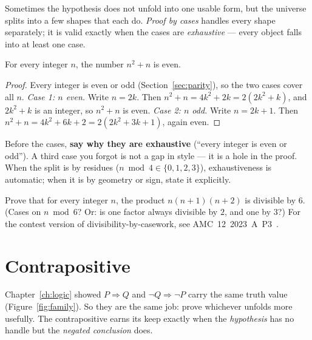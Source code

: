 Sometimes the hypothesis does not unfold into one usable form, but the universe
splits into a few shapes that each do. \emph{Proof by cases} handles every shape
separately; it is valid exactly when the cases are \emph{exhaustive} --- every
object falls into at least one case.

\begin{theorem}\label{thm:n2n}
For every integer $n$, the number $n^2 + n$ is even.
\end{theorem}

\begin{proof}
Every integer is even or odd (Section~\ref{sec:parity}), so the two cases cover
all $n$.
\emph{Case 1: $n$ even.} Write $n = 2k$. Then $n^2 + n = 4k^2 + 2k = 2(2k^2 + k)$,
and $2k^2 + k$ is an integer, so $n^2 + n$ is even.
\emph{Case 2: $n$ odd.} Write $n = 2k + 1$. Then
$n^2 + n = 4k^2 + 6k + 2 = 2(2k^2 + 3k + 1)$, again even.
\end{proof}

\begin{wins}
Before the cases, \textbf{say why they are exhaustive} (``every integer is even
or odd''). A third case you forgot is not a gap in style --- it is a hole in the
proof. When the split is by residues ($n \bmod 4 \in \{0,1,2,3\}$), exhaustiveness
is automatic; when it is by geometry or sign, state it explicitly.
\end{wins}

\begin{exercise}[medium]\label{exr:three}
Prove that for every integer $n$, the product $n(n+1)(n+2)$ is divisible by $6$.
(Cases on $n \bmod 6$? Or: is one factor always divisible by $2$, and one by $3$?)
For the contest version of divisibility-by-casework, see
AMC~12~2023~A~P3~\cite{aops-amc}.
\end{exercise}

\section{Contrapositive}\label{sec:contrapositive}

Chapter~\ref{ch:logic} showed $P \Rightarrow Q$ and $\lnot Q \Rightarrow \lnot P$
carry the same truth value (Figure~\ref{fig:family}). So they are the same job:
prove whichever unfolds more usefully. The contrapositive earns its keep exactly
when the \emph{hypothesis} has no handle but the \emph{negated conclusion} does.

